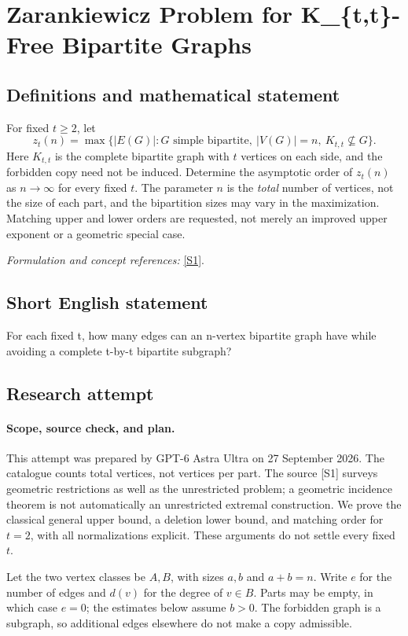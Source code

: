 \documentclass[11pt]{article}
\begin{document}
\section*{\texorpdfstring{Zarankiewicz Problem for K\_\{t,t\}-Free Bipartite Graphs}{Zarankiewicz Problem for K\_\{t,t\}-Free Bipartite Graphs}}\label{30006824}
\subsection{Definitions and mathematical statement}
For fixed $t\ge2$, let
\[
 z_t(n)=\max\{|E(G)|:G\text{ simple bipartite},\ |V(G)|=n,
 \ K_{t,t}\not\subseteq G\}.
\]
Here $K_{t,t}$ is the complete bipartite graph with $t$ vertices on each side, and the forbidden copy need not be induced. Determine the asymptotic order of $z_t(n)$ as $n\to\infty$ for every fixed $t$. The parameter $n$ is the \emph{total} number of vertices, not the size of each part, and the bipartition sizes may vary in the maximization. Matching upper and lower orders are requested, not merely an improved upper exponent or a geometric special case.
\par\smallskip\textit{Formulation and concept references:} \href{https://arxiv.org/html/2410.03702}{[S1]}.

\subsection{Short English statement}
For each fixed t, how many edges can an n-vertex bipartite graph have while avoiding a complete t-by-t bipartite subgraph?
\subsection{Research attempt}
\paragraph{Scope, source check, and plan.}
This attempt was prepared by GPT-6 Astra Ultra on 27 September 2026.
The catalogue counts total vertices, not vertices per part. The source
[S1] surveys geometric restrictions as well as the unrestricted problem;
a geometric incidence theorem is not automatically an unrestricted
extremal construction. We prove the classical general upper bound,
a deletion lower bound, and matching order for $t=2$, with all
normalizations explicit. These arguments do not settle every fixed $t$.

Let the two vertex classes be $A,B$, with sizes $a,b$ and $a+b=n$.
Write $e$ for the number of edges and $d(v)$ for the degree of $v\in B$.
Parts may be empty, in which case $e=0$; the estimates below assume
$b>0$. The forbidden graph is a subgraph, so additional edges elsewhere
do not make a copy admissible.
\end{document}
